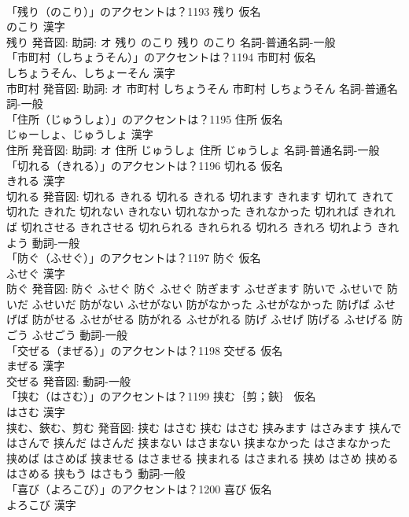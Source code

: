 \documentclass[8pt]{extreport}
\begin{document}
\begin{CJK}{UTF8}{min}
\\	「残り（のこり）」のアクセントは？1193	残り 仮名　
\\	のこり 漢字　
\\	残り 発音図: 助詞: オ	残り のこり		残り のこり				名詞-普通名詞-一般 
\\	「市町村（しちょうそん）」のアクセントは？1194	市町村 仮名　
\\	しちょうそん、しちょーそん 漢字　
\\	市町村 発音図: 助詞: オ	市町村 しちょうそん		市町村 しちょうそん				名詞-普通名詞-一般 
\\	「住所（じゅうしょ）」のアクセントは？1195	住所 仮名　
\\	じゅーしょ、じゅうしょ 漢字　
\\	住所 発音図: 助詞: オ	住所 じゅうしょ		住所 じゅうしょ				名詞-普通名詞-一般 
\\	「切れる（きれる）」のアクセントは？1196	切れる 仮名　
\\	きれる 漢字　
\\	切れる 発音図:	切れる きれる		切れる きれる 切れます きれます 切れて きれて 切れた きれた 切れない きれない 切れなかった きれなかった 切れれば きれれば 切れさせる きれさせる 切れられる きれられる 切れろ きれろ 切れよう きれよう				動詞-一般 
\\	「防ぐ（ふせぐ）」のアクセントは？1197	防ぐ 仮名　
\\	ふせぐ 漢字　
\\	防ぐ 発音図:	防ぐ ふせぐ		防ぐ ふせぐ 防ぎます ふせぎます 防いで ふせいで 防いだ ふせいだ 防がない ふせがない 防がなかった ふせがなかった 防げば ふせげば 防がせる ふせがせる 防がれる ふせがれる 防げ ふせげ 防げる ふせげる 防ごう ふせごう				動詞-一般 
\\	「交ぜる（まぜる）」のアクセントは？1198	交ぜる 仮名　
\\	まぜる 漢字　
\\	交ぜる 発音図:							動詞-一般 
\\	「挟む（はさむ）」のアクセントは？1199	挟む｛剪；鋏｝ 仮名　
\\	はさむ 漢字　
\\	挟む、鋏む、剪む 発音図:	挟む はさむ		挟む はさむ 挟みます はさみます 挟んで はさんで 挟んだ はさんだ 挟まない はさまない 挟まなかった はさまなかった 挟めば はさめば 挟ませる はさませる 挟まれる はさまれる 挟め はさめ 挟める はさめる 挟もう はさもう				動詞-一般 
\\	「喜び（よろこび）」のアクセントは？1200	喜び 仮名　
\\	よろこび 漢字　

\end{CJK}
\end{document}
